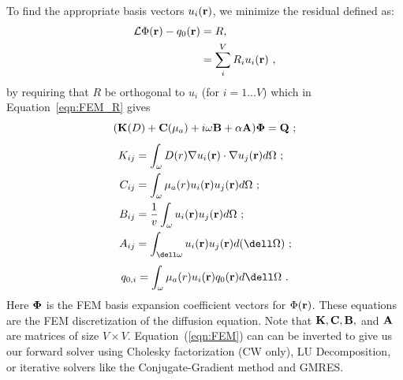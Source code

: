 To find the appropriate basis vectors $u_i(\mathbf{r})$, we minimize the residual defined as:
\begin{align}
\label{eqn:FEM_R}
\mathcal{L}\Phi(\mathbf{r}) - q_0(\mathbf{r})
&= R, \\
&= \sum_i^V R_i u_i(\mathbf{r}) \ ,
\end{align}
%
by requiring that $R$ be orthogonal to $u_i$ (for $i=1...V$) which in Equation~\ref{eqn:FEM_R} gives
\begin{equation}
\label{eqn:FEM}
(\mathbf{K}(D) + \mathbf{C}(\mu_a) + i\omega\mathbf{B} + \alpha\mathbf{A})\mathbf{\Phi}= \mathbf{Q} \ ;
\end{equation}
\begin{align}
K_{ij} &= \int_\omega D(r)\nabla u_i(\mbf{r})\cdot\nabla u_j(\mbf{r}) d\Omega \ ; \\
C_{ij} &= \int_\omega \mua(r) u_i(\mbf{r})u_j(\mbf{r}) d\Omega \ ; \\
B_{ij} &= \frac{1}{v}\int_\omega u_i(\mbf{r})u_j(\mbf{r}) d\Omega \ ; \\
A_{ij} &= \int_{\dell\omega} u_i(\mbf{r})u_j(\mbf{r}) d(\dell\Omega) \ ;
\end{align}
\begin{equation}
q_{0,i} = \int_{\omega} \mua(r) u_i(\mbf{r})q_0(\mbf{r}) d\dell\Omega \ .
\end{equation}
Here $\mathbf{\Phi}$ is the FEM basis expansion coefficient vectors for $\Phi(\mathbf{r})$. These equations are the FEM discretization of the diffusion equation. Note that $\mathbf{K},\mathbf{C},\mathbf{B},$ and $\mathbf{A}$ are matrices of size $V\times V$. Equation~(\ref{eqn:FEM}) can can be inverted to give us our forward solver using Cholesky factorization (CW only), LU Decomposition, or iterative solvers like the Conjugate-Gradient method and GMRES.

